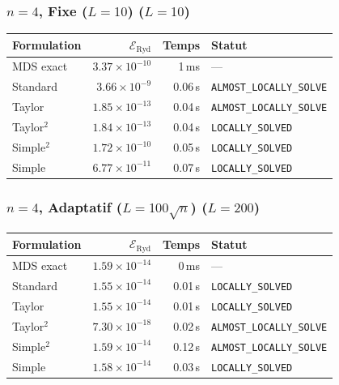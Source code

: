 \subsubsection{$n=4$, Fixe ($L{=}10$) ($L=10$)}
\begin{longtable}{@{}lrrl@{}}
  \toprule
  Formulation & $\mathcal{E}_{\mathrm{Ryd}}$ & Temps & Statut \\
  \midrule
  \endhead
  MDS exact & $3.37\times10^{-10}$ & 1\,ms & --- \\
  Standard & $3.66\times10^{-9}$ & 0.06\,s & \texttt{ALMOST\_LOCALLY\_SOLVE} \\
  Taylor & $1.85\times10^{-13}$ & 0.04\,s & \texttt{ALMOST\_LOCALLY\_SOLVE} \\
  Taylor$^2$ & $1.84\times10^{-13}$ & 0.04\,s & \texttt{LOCALLY\_SOLVED} \\
  Simple$^2$ & $1.72\times10^{-10}$ & 0.05\,s & \texttt{LOCALLY\_SOLVED} \\
  Simple & $6.77\times10^{-11}$ & 0.07\,s & \texttt{LOCALLY\_SOLVED} \\
  \bottomrule
\end{longtable}

\subsubsection{$n=4$, Adaptatif ($L{=}100\sqrt{n}$) ($L=200$)}
\begin{longtable}{@{}lrrl@{}}
  \toprule
  Formulation & $\mathcal{E}_{\mathrm{Ryd}}$ & Temps & Statut \\
  \midrule
  \endhead
  MDS exact & $1.59\times10^{-14}$ & 0\,ms & --- \\
  Standard & $1.55\times10^{-14}$ & 0.01\,s & \texttt{LOCALLY\_SOLVED} \\
  Taylor & $1.55\times10^{-14}$ & 0.01\,s & \texttt{LOCALLY\_SOLVED} \\
  Taylor$^2$ & $7.30\times10^{-18}$ & 0.02\,s & \texttt{ALMOST\_LOCALLY\_SOLVE} \\
  Simple$^2$ & $1.59\times10^{-14}$ & 0.12\,s & \texttt{ALMOST\_LOCALLY\_SOLVE} \\
  Simple & $1.58\times10^{-14}$ & 0.03\,s & \texttt{LOCALLY\_SOLVED} \\
  \bottomrule
\end{longtable}

